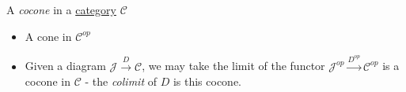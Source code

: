 A \emph{cocone} in a \href{doc/1 math/Seven Sketches in Compositionality/Chapter 3: Databases/2 Categories/1 Free Categories/1 Category}{category} $\mathcal{C}$

\begin{itemize}
    \item  A cone in $\mathcal{C}^{op}$
    \item Given a diagram $\mathcal{J}\xrightarrow{D}\mathcal{C}$, we may take the limit of the functor $\mathcal{J}^{op}\xrightarrow{D^{op}}\mathcal{C}^{op}$ is a cocone in $\mathcal{C}$ - the \emph{colimit} of $D$ is this cocone.
  \end{itemize}
